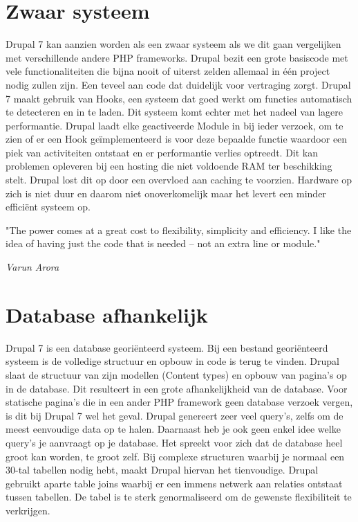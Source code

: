 \section{Zwaar systeem}
Drupal 7 kan aanzien worden als een zwaar systeem als we dit gaan vergelijken met verschillende andere PHP frameworks. Drupal bezit een grote basiscode met vele functionaliteiten die bijna nooit of uiterst zelden allemaal in één project nodig zullen zijn. Een teveel aan code dat duidelijk voor vertraging zorgt. Drupal 7 maakt gebruik van Hooks, een systeem dat goed werkt om functies automatisch te detecteren en in te laden. Dit systeem komt echter met het nadeel van lagere performantie. Drupal laadt elke geactiveerde Module in bij ieder verzoek, om te zien of er een Hook geïmplementeerd is voor deze bepaalde functie waardoor een piek van activiteiten ontstaat en er performantie verlies optreedt. Dit kan problemen opleveren bij een hosting die niet voldoende RAM ter beschikking stelt. Drupal lost dit op door een overvloed aan caching te voorzien. Hardware op zich is niet duur en daarom niet onoverkomelijk maar het levert een minder efficiënt systeem op.    

\epigraph{"The power comes at a great cost to flexibility, simplicity and efficiency. I like the idea of having just the code that is needed – not an extra line or module."}{\textit{Varun Arora \citet{aroraVarun2013WhyPlatform}}}


\section{Database afhankelijk}
Drupal 7 is een database georiënteerd systeem. Bij een bestand georiënteerd systeem is de volledige structuur en opbouw in code is terug te vinden. Drupal slaat de structuur van zijn modellen (Content types) en opbouw van pagina's op in de database. Dit resulteert in een grote afhankelijkheid van de database. Voor statische pagina's die in een ander PHP framework geen database verzoek vergen, is dit bij Drupal 7 wel het geval.  
\newline\newline
Drupal genereert zeer veel query's, zelfs om de meest eenvoudige data op te halen. Daarnaast heb je ook geen enkel idee welke query's je aanvraagt op je database. Het spreekt voor zich dat de database heel groot kan worden, te groot zelf. Bij complexe structuren waarbij je normaal een 30-tal tabellen nodig hebt, maakt Drupal hiervan het tienvoudige. Drupal gebruikt aparte table joins waarbij er een immens netwerk aan relaties ontstaat tussen tabellen. De tabel is te sterk genormaliseerd om de gewenste flexibiliteit te verkrijgen.


